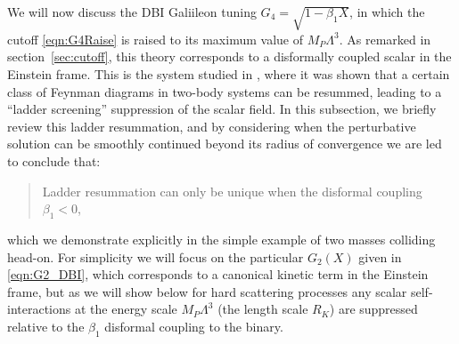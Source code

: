 \documentclass[11pt]{article}
\begin{document}
We will now discuss the DBI Galiileon tuning $G_4 = \sqrt{1- \beta_1 X}$, in which the cutoff \eqref{eqn:G4Raise} is raised to its maximum value of $M_P \Lambda^3$. 
As remarked in section~\ref{sec:cutoff}, this theory corresponds to a disformally coupled scalar in the Einstein frame. This is the system studied in \cite{Davis:2019ltc}, where it was shown that a certain class of Feynman diagrams in two-body systems can be resummed, leading to a ``ladder screening'' suppression of the scalar field. 
In this subsection, we briefly review this ladder resummation, 
and by considering when the perturbative solution can be smoothly continued beyond its radius of convergence we are led to conclude that: 
\begin{quotation}
\centering
Ladder resummation can only be unique when the disformal coupling $\beta_1 < 0$, 
\end{quotation}
which we demonstrate explicitly in the simple example of two masses colliding head-on. 
For simplicity we will focus on the particular $G_2 (X)$ given in \eqref{eqn:G2_DBI}, which corresponds to a canonical kinetic term in the Einstein frame, but as we will show below for hard scattering processes any scalar self-interactions at the energy scale $M_P \Lambda^3$ (the length scale $R_K$) are suppressed relative to the $\beta_1$ disformal coupling to the binary. 


\end{document}
